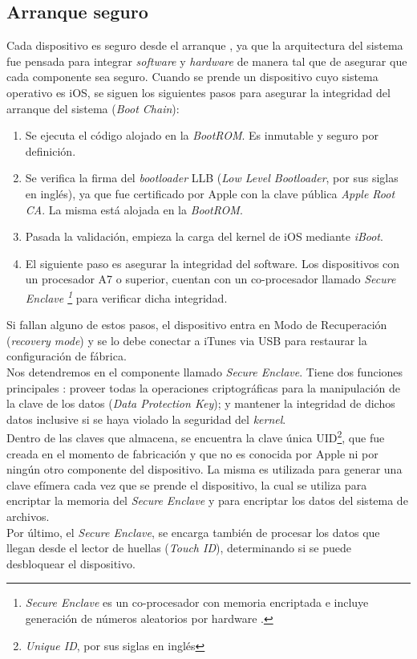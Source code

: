 \subsection{Arranque seguro}\label{fig:ch02:arranque}
Cada dispositivo es seguro desde el arranque \cite{asg}, ya que la arquitectura del sistema fue pensada para integrar \textit{software} y \textit{hardware} de manera tal que de asegurar que cada componente sea seguro. Cuando se prende un dispositivo cuyo sistema operativo es iOS, se siguen los siguientes pasos para asegurar la integridad del arranque del sistema (\textit{Boot Chain}):
\begin{enumerate}
	\item Se ejecuta el código alojado en la \textit{BootROM}. Es inmutable y seguro por definición.
	\item Se verifica la firma del \textit{bootloader} LLB (\textit{Low Level Bootloader}, por sus siglas en ingl\'es), ya que fue certificado por Apple con la clave pública \textit{Apple Root CA}. La misma está alojada en la \textit{BootROM}. 
	\item Pasada la validación, empieza la carga del kernel de iOS mediante \textit{iBoot}.
	\item El siguiente paso es asegurar la integridad del software. Los dispositivos con un procesador A7 o superior, cuentan con un co-procesador llamado \textit{Secure Enclave \footnote{\textit{Secure Enclave} es un co-procesador con memoria encriptada e incluye generación de números aleatorios por hardware \cite{asg}.}} para verificar dicha integridad.
\end{enumerate}
Si fallan alguno de estos pasos, el dispositivo entra en Modo de Recuperación (\textit{recovery mode}) y se lo debe conectar a iTunes via USB para restaurar la configuración de fábrica.\\
Nos detendremos en el componente llamado \textit{Secure Enclave}. Tiene dos funciones principales \cite{asg}: proveer todas la operaciones criptográficas para la manipulación de la clave de los datos (\textit{Data Protection Key}); y mantener la integridad de dichos datos inclusive si se haya violado la seguridad del \textit{kernel}.\\
Dentro de las claves que almacena, se encuentra la clave única UID\footnote{\textit{Unique ID}, por sus siglas en inglés}, que fue creada en el momento de fabricación y que no es conocida por Apple ni por ningún otro componente del dispositivo. La misma es utilizada para generar una clave efímera cada vez que se prende el dispositivo, la cual se utiliza para encriptar la memoria del \textit{Secure Enclave} y para encriptar los datos del sistema de archivos.\\
Por último, el \textit{Secure Enclave}, se encarga también de procesar los datos que llegan desde el lector de huellas (\textit{Touch ID}), determinando si se puede desbloquear el dispositivo.
